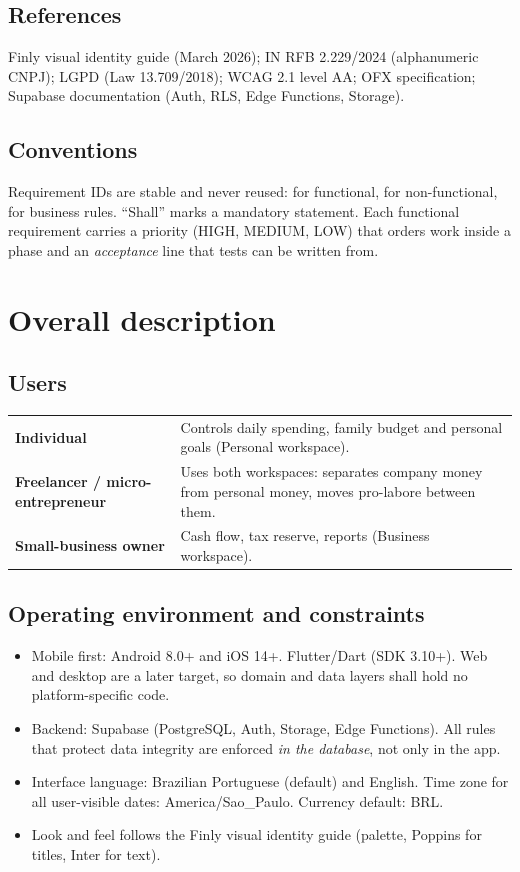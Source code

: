 \documentclass[11pt,a4paper]{article}
\newcommand{\code}[1]{\texttt{\detokenize{#1}}}
\begin{document}
\subsection{References}
Finly visual identity guide (March 2026); IN RFB 2.229/2024 (alphanumeric CNPJ); LGPD (Law 13.709/2018); WCAG 2.1 level AA; OFX specification; Supabase documentation (Auth, RLS, Edge Functions, Storage).

\subsection{Conventions}
Requirement IDs are stable and never reused: \code{FR-<module>NN} for functional, \code{NFR-NN} for non-functional, \code{BR-NN} for business rules. ``Shall'' marks a mandatory statement. Each functional requirement carries a priority (HIGH, MEDIUM, LOW) that orders work inside a phase and an \emph{acceptance} line that tests can be written from.

\section{Overall description}

\subsection{Users}
\begin{tabularx}{\textwidth}{@{}>{\bfseries}l X@{}}
\toprule
Individual & Controls daily spending, family budget and personal goals (Personal workspace). \\
Freelancer / micro-entrepreneur & Uses both workspaces: separates company money from personal money, moves pro-labore between them. \\
Small-business owner & Cash flow, tax reserve, reports (Business workspace). \\
\bottomrule
\end{tabularx}

\subsection{Operating environment and constraints}
\begin{itemize}
  \item Mobile first: Android 8.0+ and iOS 14+. Flutter/Dart (SDK 3.10+). Web and desktop are a later target, so domain and data layers shall hold no platform-specific code.
  \item Backend: Supabase (PostgreSQL, Auth, Storage, Edge Functions). All rules that protect data integrity are enforced \emph{in the database}, not only in the app.
  \item Interface language: Brazilian Portuguese (default) and English. Time zone for all user-visible dates: America/Sao\_Paulo. Currency default: BRL.
  \item Look and feel follows the Finly visual identity guide (palette, Poppins for titles, Inter for text).
\end{itemize}
\end{document}
